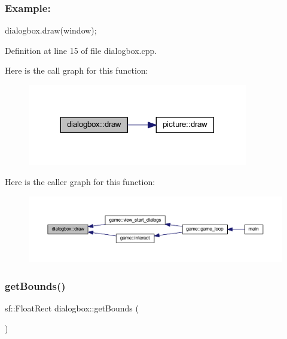 \subsubsection*{Example\+: }

dialogbox.\+draw(window); 

Definition at line 15 of file dialogbox.\+cpp.

Here is the call graph for this function\+:
\nopagebreak
\begin{figure}[H]
\begin{center}
\leavevmode
\includegraphics[width=272pt]{classdialogbox_a722438dee05d120c77871b1ec9d26cf5_cgraph}
\end{center}
\end{figure}
Here is the caller graph for this function\+:
\nopagebreak
\begin{figure}[H]
\begin{center}
\leavevmode
\includegraphics[width=350pt]{classdialogbox_a722438dee05d120c77871b1ec9d26cf5_icgraph}
\end{center}
\end{figure}
\mbox{\label{classdialogbox_aeb83bd7a568feeb4be10a0335838ae2a}} 
\subsubsection{\texorpdfstring{get\+Bounds()}{getBounds()}}
{\footnotesize\ttfamily sf\+::\+Float\+Rect dialogbox\+::get\+Bounds (\begin{DoxyParamCaption}{ }\end{DoxyParamCaption})}



